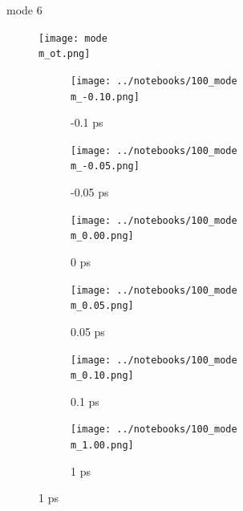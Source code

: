 \documentclass{beamer}
\begin{document}
\renewcommand\m{6}
\begin{frame}{mode \m}
	\vspace{\vh mm}
	\begin{figure}
		\centering
		\texttt{[image: mode\\m\_ot.png]}
	\end{figure}
	\begin{figure}
		\centering
		\begin{subfigure}[b]{\w\textwidth}
			\centering
			\texttt{[image: ../notebooks/100\_mode\\m\_-0.10.png]}
			\caption{-0.1 ps}
		\end{subfigure}
		\begin{subfigure}[b]{\w\textwidth}
			\centering
			\texttt{[image: ../notebooks/100\_mode\\m\_-0.05.png]}
			\caption{-0.05 ps}
		\end{subfigure}
		\begin{subfigure}[b]{\w\textwidth}
			\centering
			\texttt{[image: ../notebooks/100\_mode\\m\_0.00.png]}
			\caption{0 ps}
		\end{subfigure}
		\begin{subfigure}[b]{\w\textwidth}
			\centering
			\texttt{[image: ../notebooks/100\_mode\\m\_0.05.png]}
			\caption{0.05 ps}
		\end{subfigure}
		\begin{subfigure}[b]{\w\textwidth}
			\centering
			\texttt{[image: ../notebooks/100\_mode\\m\_0.10.png]}
			\caption{0.1 ps}
		\end{subfigure}
		\begin{subfigure}[b]{\w\textwidth}
			\centering
			\texttt{[image: ../notebooks/100\_mode\\m\_1.00.png]}
			\caption{1 ps}
		\end{subfigure}
	\end{figure}
\end{frame}

\renewcommand\m{7}
\end{document}
